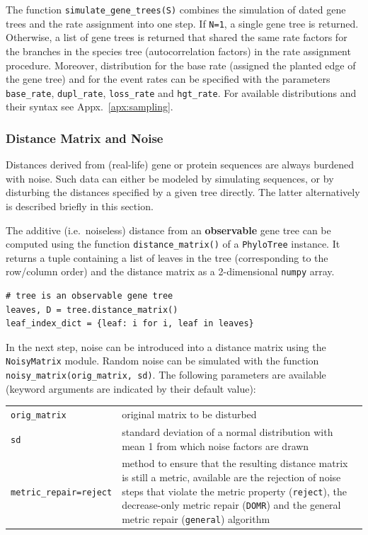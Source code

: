\documentclass[hidelinks,11pt]{article}
\newcommand{\sq}{\textquotesingle}
\begin{document}
\noindent
The function \texttt{simulate\_gene\_trees(S)} combines the simulation of dated gene trees and the rate assignment into one step.
If \texttt{N=1}, a single gene tree is returned.
Otherwise, a list of gene trees is returned that shared the same rate factors for the branches in the species tree (autocorrelation factors) in the rate assignment procedure.
Moreover, distribution for the base rate (assigned the planted edge of the
gene tree) and for the event rates can be specified with the parameters
\texttt{base\_rate}, \texttt{dupl\_rate}, \texttt{loss\_rate} and
\texttt{hgt\_rate}.
For available distributions and their syntax see Appx.~\ref{apx:sampling}.


\subsubsection{Distance Matrix and Noise}

Distances derived from (real-life) gene or protein sequences are always burdened with noise.
Such data can either be modeled by simulating sequences, or by disturbing the distances specified by a given tree directly.
The latter alternatively is described briefly in this section.

The additive (i.e.\ noiseless) distance from an \textbf{observable} gene tree can be computed using the function \texttt{distance\_matrix()} of a \texttt{PhyloTree} instance.
It returns a tuple containing a list of leaves in the tree (corresponding to the row/column order) and the distance matrix as a 2-dimensional \texttt{numpy} array.

\begin{adjustwidth}{1cm}{1cm}\vspace{2mm}
\begin{verbatim}
# tree is an observable gene tree
leaves, D = tree.distance_matrix()
leaf_index_dict = {leaf: i for i, leaf in leaves}
\end{verbatim}
\end{adjustwidth}

In the next step, noise can be introduced into a distance matrix using the \texttt{NoisyMatrix} module.
Random noise can be simulated with the function \texttt{noisy\_matrix(orig\_matrix, sd)}.
The following parameters are available (keyword arguments are indicated by their default value):

\vspace{3mm}
{\small\centering
\begin{longtable}{ p{4.5cm} p{9cm} }
	\texttt{orig\_matrix} & original matrix to be disturbed\\
	\texttt{sd}  & standard deviation of a normal distribution with mean 1 from which noise factors are drawn\\
	\texttt{metric\_repair=\sq reject\sq}  & method to ensure that the resulting
	distance matrix is still a metric, available are the rejection of noise steps
	that violate the metric property (\texttt{\sq reject\sq}), the decrease-only
	metric repair (\texttt{\sq DOMR\sq}) and the general metric repair
	(\texttt{\sq general\sq}) algorithm\\
\end{longtable}
}
\vspace{3mm}
\end{document}
